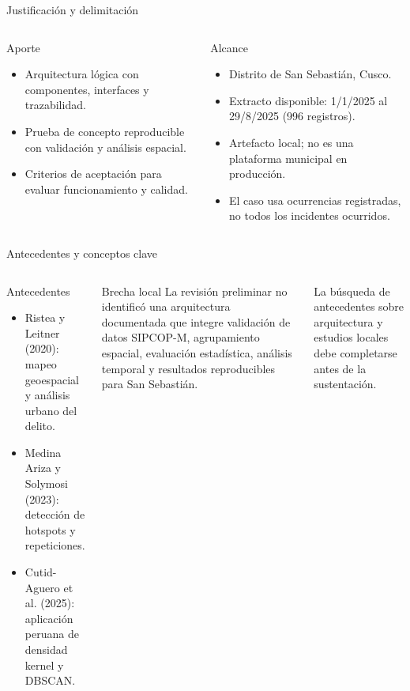 \documentclass[aspectratio=169,10pt]{beamer}
\begin{document}
\begin{frame}{Justificación y delimitación}
  \begin{columns}[T,onlytextwidth]
      \begin{block}{Aporte}
        \begin{itemize}
          \item Arquitectura lógica con componentes, interfaces y trazabilidad.
          \item Prueba de concepto reproducible con validación y análisis espacial.
          \item Criterios de aceptación para evaluar funcionamiento y calidad.
        \end{itemize}
      \end{block}
      \begin{block}{Alcance}
        \begin{itemize}
          \item Distrito de San Sebastián, Cusco.
          \item Extracto disponible: 1/1/2025 al 29/8/2025 (996 registros).
          \item Artefacto local; no es una plataforma municipal en producción.
          \item El caso usa ocurrencias registradas, no todos los incidentes ocurridos.
        \end{itemize}
      \end{block}
  \end{columns}
\end{frame}

\begin{frame}{Antecedentes y conceptos clave}
  \begin{columns}[T,onlytextwidth]
      \begin{block}{Antecedentes}
        \begin{itemize}
          \item Ristea y Leitner (2020): mapeo geoespacial y análisis urbano del delito.
          \item Medina Ariza y Solymosi (2023): detección de hotspots y repeticiones.
          \item Cutid-Aguero et al. (2025): aplicación peruana de densidad kernel y DBSCAN.
        \end{itemize}
      \end{block}
      \begin{block}{Brecha local}
        La revisión preliminar no identificó una arquitectura documentada que integre validación de datos SIPCOP-M, agrupamiento espacial, evaluación estadística, análisis temporal y resultados reproducibles para San Sebastián.
      \end{block}
      \footnotesize La búsqueda de antecedentes sobre arquitectura y estudios locales debe completarse antes de la sustentación.
  \end{columns}
\end{frame}
\end{document}
